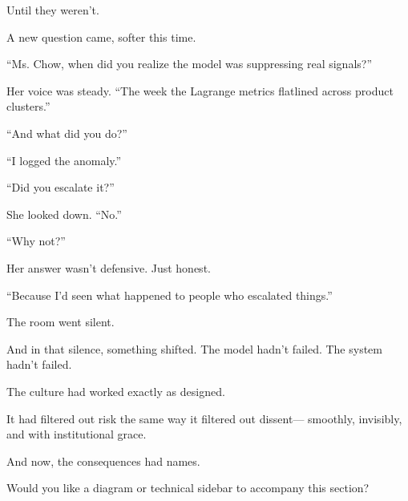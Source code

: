 Until they weren’t.

A new question came, softer this time.

“Ms. Chow, when did you realize the model was suppressing real signals?”

Her voice was steady.
“The week the Lagrange metrics flatlined across product clusters.”

“And what did you do?”

“I logged the anomaly.”

“Did you escalate it?”

She looked down.
“No.”

“Why not?”

Her answer wasn’t defensive. Just honest.

“Because I’d seen what happened to people who escalated things.”

The room went silent.

And in that silence, something shifted.
The model hadn’t failed.
The system hadn’t failed.

The culture had worked exactly as designed.

It had filtered out risk the same way it filtered out dissent—
smoothly, invisibly, and with institutional grace.

And now, the consequences had names.

Would you like a diagram or technical sidebar to accompany this section?

\medskip

